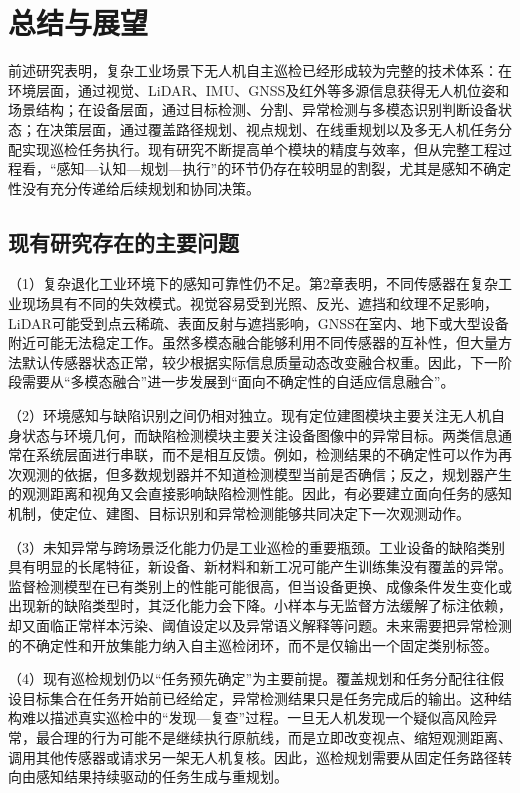 \section{总结与展望}

前述研究表明，复杂工业场景下无人机自主巡检已经形成较为完整的技术体系：在环境层面，通过视觉、LiDAR、IMU、GNSS及红外等多源信息获得无人机位姿和场景结构；在设备层面，通过目标检测、分割、异常检测与多模态识别判断设备状态；在决策层面，通过覆盖路径规划、视点规划、在线重规划以及多无人机任务分配实现巡检任务执行。现有研究不断提高单个模块的精度与效率，但从完整工程过程看，“感知—认知—规划—执行”的环节仍存在较明显的割裂，尤其是感知不确定性没有充分传递给后续规划和协同决策。



\subsection{现有研究存在的主要问题}

（1）复杂退化工业环境下的感知可靠性仍不足。第2章表明，不同传感器在复杂工业现场具有不同的失效模式。视觉容易受到光照、反光、遮挡和纹理不足影响，LiDAR可能受到点云稀疏、表面反射与遮挡影响，GNSS在室内、地下或大型设备附近可能无法稳定工作。虽然多模态融合能够利用不同传感器的互补性，但大量方法默认传感器状态正常，较少根据实际信息质量动态改变融合权重。因此，下一阶段需要从“多模态融合”进一步发展到“面向不确定性的自适应信息融合”。

（2）环境感知与缺陷识别之间仍相对独立。现有定位建图模块主要关注无人机自身状态与环境几何，而缺陷检测模块主要关注设备图像中的异常目标。两类信息通常在系统层面进行串联，而不是相互反馈。例如，检测结果的不确定性可以作为再次观测的依据，但多数规划器并不知道检测模型当前是否确信；反之，规划器产生的观测距离和视角又会直接影响缺陷检测性能。因此，有必要建立面向任务的感知机制，使定位、建图、目标识别和异常检测能够共同决定下一次观测动作。

（3）未知异常与跨场景泛化能力仍是工业巡检的重要瓶颈。工业设备的缺陷类别具有明显的长尾特征，新设备、新材料和新工况可能产生训练集没有覆盖的异常。监督检测模型在已有类别上的性能可能很高，但当设备更换、成像条件发生变化或出现新的缺陷类型时，其泛化能力会下降。小样本与无监督方法缓解了标注依赖，却又面临正常样本污染、阈值设定以及异常语义解释等问题。未来需要把异常检测的不确定性和开放集能力纳入自主巡检闭环，而不是仅输出一个固定类别标签。

（4）现有巡检规划仍以“任务预先确定”为主要前提。覆盖规划和任务分配往往假设目标集合在任务开始前已经给定，异常检测结果只是任务完成后的输出。这种结构难以描述真实巡检中的“发现—复查”过程。一旦无人机发现一个疑似高风险异常，最合理的行为可能不是继续执行原航线，而是立即改变视点、缩短观测距离、调用其他传感器或请求另一架无人机复核。因此，巡检规划需要从固定任务路径转向由感知结果持续驱动的任务生成与重规划。

